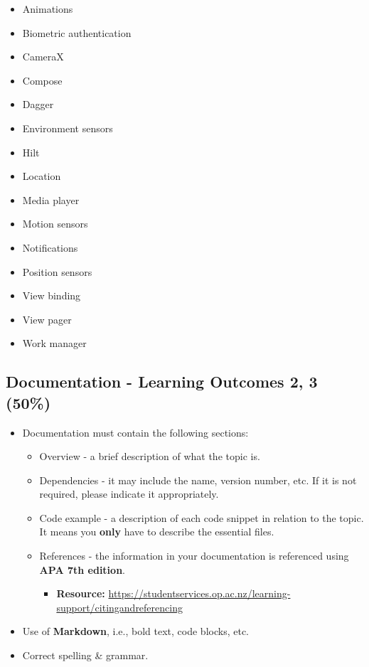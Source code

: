 \documentclass{article}
\begin{document}
\begin{itemize}
	\item Animations
	\item Biometric authentication
	\item CameraX
	\item Compose
	\item Dagger
	\item Environment sensors
	\item Hilt
	\item Location
	\item Media player
	\item Motion sensors
	\item Notifications
	\item Position sensors
	\item View binding
	\item View pager
	\item Work manager
\end{itemize}

\subsection*{Documentation - Learning Outcomes 2, 3 (50\%)}
\begin{itemize}
	\item Documentation must contain the following sections:
	      \begin{itemize}
		      \item Overview - a brief description of what the topic is.
		      \item Dependencies - it may include the name, version number, etc. If it is not required, please indicate it appropriately.
		      \item Code example - a description of each code snippet in relation to the topic. It means you \textbf{only} have to describe the essential files.
		      \item References - the information in your documentation is referenced using \textbf{APA 7th edition}.
		            \begin{itemize}
			            \item \textbf{Resource:} \href{https://studentservices.op.ac.nz/learning-support/citingandreferencing}{https://studentservices.op.ac.nz/learning-support/citingandreferencing}
		            \end{itemize}
	      \end{itemize}
	\item Use of \textbf{Markdown}, i.e., bold text, code blocks, etc.
	\item Correct spelling \& grammar.
\end{itemize}
\end{document}
